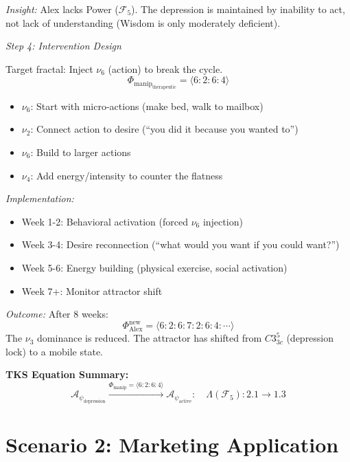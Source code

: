 \documentclass[11pt,twoside]{book}
\theoremstyle{definition}
\theoremstyle{plain}
\theoremstyle{remark}
\newcommand{\Foundations}{\mathcal{F}}
\newcommand{\noe}[1]{\nu_{#1}}
\newcommand{\Frac}{\Phi}
\newcommand{\PsychAttractor}{\mathcal{A}_\psi}
\newcommand{\Lacunarity}{\Lambda}
\newcommand{\ManipFrac}{\Phi_{\mathrm{manip}}}
\begin{document}
\begin{tcolorbox}[colback=yellow!5!white,colframe=yellow!65!black,title=\textbf{Scenario: Depression Treatment via Attractor Shift},breakable]
\textit{Insight:} Alex lacks Power ($\Foundations_5$). The depression is maintained by inability to act, not lack of understanding (Wisdom is only moderately deficient).

\textit{Step 4: Intervention Design}

Target fractal: Inject $\noe{6}$ (action) to break the cycle.
\[
    \ManipFrac_{\mathrm{therapeutic}} = \langle 6:2:6:4 \rangle
\]
\begin{itemize}
    \item $\noe{6}$: Start with micro-actions (make bed, walk to mailbox)
    \item $\noe{2}$: Connect action to desire (``you did it because you wanted to'')
    \item $\noe{6}$: Build to larger actions
    \item $\noe{4}$: Add energy/intensity to counter the flatness
\end{itemize}

\textit{Implementation:}
\begin{itemize}
    \item Week 1-2: Behavioral activation (forced $\noe{6}$ injection)
    \item Week 3-4: Desire reconnection (``what would you want if you could want?'')
    \item Week 5-6: Energy building (physical exercise, social activation)
    \item Week 7+: Monitor attractor shift
\end{itemize}

\textit{Outcome:}
After 8 weeks:
\[
    \Frac_{\mathrm{Alex}}^{\mathrm{new}} = \langle 6:2:6:7:2:6:4:\cdots \rangle
\]
The $\noe{3}$ dominance is reduced. The attractor has shifted from $C3^5_{3c}$ (depression lock) to a mobile state.

\textbf{TKS Equation Summary:}
\begin{equation}
\boxed{
    \PsychAttractor_{\mathrm{depression}} \xrightarrow{\ManipFrac = \langle 6:2:6:4 \rangle}
    \PsychAttractor_{\mathrm{active}} : \quad \Lacunarity(\Foundations_5) : 2.1 \to 1.3
}
\end{equation}

\end{tcolorbox}

\section{Scenario 2: Marketing Application}
\end{document}
